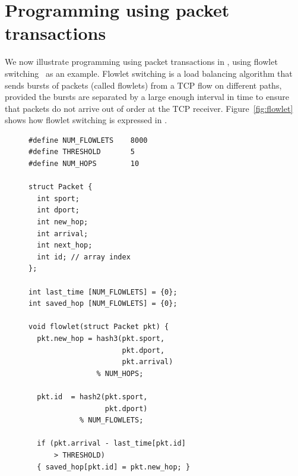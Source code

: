 \section{Programming using packet transactions}
\label{s:transactions}

We now illustrate programming using packet transactions in \pktlanguage, using
flowlet switching~\cite{flowlets} as an example. Flowlet switching is a load
balancing algorithm that sends bursts of packets (called flowlets) from a TCP
flow on different paths, provided the bursts are separated by a large enough
interval in time to ensure that packets do not arrive out of order at the TCP
receiver. Figure~\ref{fig:flowlet} shows how flowlet switching is expressed in
\pktlanguage.

\begin{figure}[!t]
\begin{minipage}{0.6\textwidth}
\begin{small}
\begin{lstlisting}[style=customc]
#define NUM_FLOWLETS    8000
#define THRESHOLD       5
#define NUM_HOPS        10

struct Packet {
  int sport;
  int dport;
  int new_hop;
  int arrival;
  int next_hop;
  int id; // array index
};

int last_time [NUM_FLOWLETS] = {0};
int saved_hop [NUM_FLOWLETS] = {0};

void flowlet(struct Packet pkt) {
  pkt.new_hop = hash3(pkt.sport,
                      pkt.dport,
                      pkt.arrival)
                % NUM_HOPS;

  pkt.id  = hash2(pkt.sport,
                  pkt.dport)
            % NUM_FLOWLETS;

  if (pkt.arrival - last_time[pkt.id] 
      > THRESHOLD) 
  { saved_hop[pkt.id] = pkt.new_hop; }


\end{lstlisting}
\end{small}
\end{minipage}
\end{figure}
